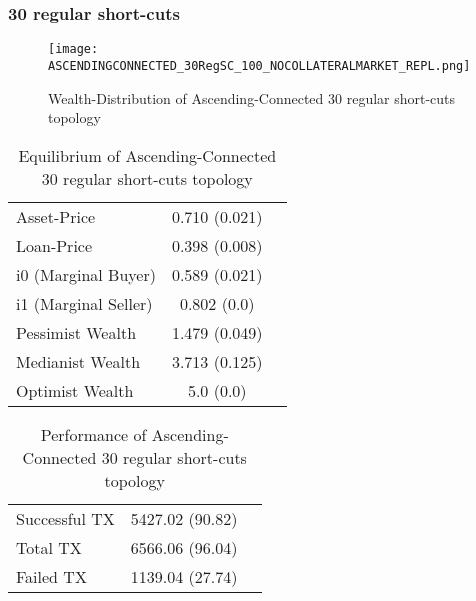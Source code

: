 \documentclass[Bachelorarbeit.tex]{subfiles}
\begin{document}
\subsubsection{30 regular short-cuts}
\begin{figure}[H]
	\centering
  \texttt{[image: ASCENDINGCONNECTED\_30RegSC\_100\_NOCOLLATERALMARKET\_REPL.png]}
	\caption{Wealth-Distribution of Ascending-Connected 30 regular short-cuts topology}
	\label{fig1}
\end{figure}

\begin{table}[H]
	\caption{Equilibrium of Ascending-Connected 30 regular short-cuts topology}
	\centering
	\begin{tabular} { l c r }
		\hline
		Asset-Price & 0.710 (0.021) \\
		Loan-Price & 0.398 (0.008) \\
		i0 (Marginal Buyer) & 0.589 (0.021) \\
		i1 (Marginal Seller) & 0.802 (0.0) \\
		Pessimist Wealth & 1.479 (0.049) \\
		Medianist Wealth & 3.713 (0.125) \\
		Optimist Wealth & 5.0 (0.0) \\
		\hline
	\end{tabular}
\end{table} 

\begin{table}[H]
	\caption{Performance of Ascending-Connected 30 regular short-cuts topology}
	\centering
	\begin{tabular} { l c r }
		\hline
		Successful TX & 5427.02 (90.82) \\
		Total TX & 6566.06 (96.04) \\
		Failed TX & 1139.04 (27.74) \\
		\hline
	\end{tabular}
\end{table}
\end{document}
